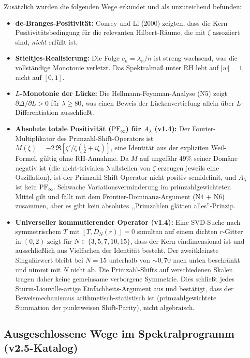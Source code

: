 \documentclass[12pt,a4paper]{article}
\theoremstyle{definition}
\theoremstyle{remark}
\begin{document}
Zusätzlich wurden die folgenden Wege erkundet und als unzureichend befunden:
\begin{itemize}
  \item \textbf{de-Branges-Positivität:} Conrey und Li (2000) zeigten, dass die Kern-Positivitätsbedingung für die relevanten Hilbert-Räume, die mit $\zeta$ assoziiert sind, \emph{nicht} erfüllt ist.
  \item \textbf{Stieltjes-Realisierung:} Die Folge $c_n = \lambda_n/n$ ist streng wachsend, was die vollständige Monotonie verletzt. Das Spektralmaß unter RH lebt auf $|w| = 1$, nicht auf $[0,1]$.
  \item \textbf{$L$-Monotonie der Lücke:} Die Hellmann-Feynman-Analyse (N5) zeigt $\partial\Delta/\partial L > 0$ für $\lambda \geq 80$, was einen Beweis der Lückenvertiefung allein über $L$-Differentiation ausschließt.
  \item \textbf{Absolute totale Positivität ($\mathrm{PF}_\infty$) für $A_\lambda$ (v1.4):} Der Fourier-Multiplikator des Primzahl-Shift-Operators ist $M(\xi) = -2\,\Re[\zeta'/\zeta(\tfrac{1}{2}+i\xi)]$, eine Identität aus der expliziten Weil-Formel, gültig ohne RH-Annahme. Da $M$ auf ungefähr $49\%$ seiner Domäne negativ ist (die nicht-trivialen Nullstellen von $\zeta$ erzeugen jeweils eine Oszillation), ist der Primzahl-Shift-Operator nicht positiv-semidefinit, und $A_\lambda$ ist kein $\mathrm{PF}_\infty$. Schwache Variationsverminderung im primzahlgewichteten Mittel gilt und fällt mit dem Frontier-Dominanz-Argument (N4 + N6) zusammen, aber es gibt kein absolutes ,,Primzahlen glätten alles''-Prinzip.
  \item \textbf{Universeller kommutierender Operator (v1.4):} Eine SVD-Suche nach symmetrischem $T$ mit $[T, D_N(r)] = 0$ simultan auf einem dichten $r$-Gitter in $(0,2)$ zeigt für $N \in \{3,5,7,10,15\}$, dass der Kern eindimensional ist und ausschließlich aus Vielfachen der Identität besteht. Der zweitkleinste Singulärwert bleibt bei $N = 15$ unterhalb von $\sim\!0{,}70$ nach unten beschränkt und nimmt mit $N$ nicht ab. Die Primzahl-Shifts auf verschiedenen Skalen tragen daher keine gemeinsame verborgene Symmetrie. Dies schließt jedes Sturm-Liouville-artige Einfachheits-Argument aus und bestätigt, dass der Beweismechanismus arithmetisch-statistisch ist (primzahlgewichtete Summation der punktweisen Shift-Parity), nicht algebraisch.
\end{itemize}

\subsection*{Ausgeschlossene Wege im Spektralprogramm (v2.5-Katalog)}
\label{sec:excluded-spectral}
\end{document}

